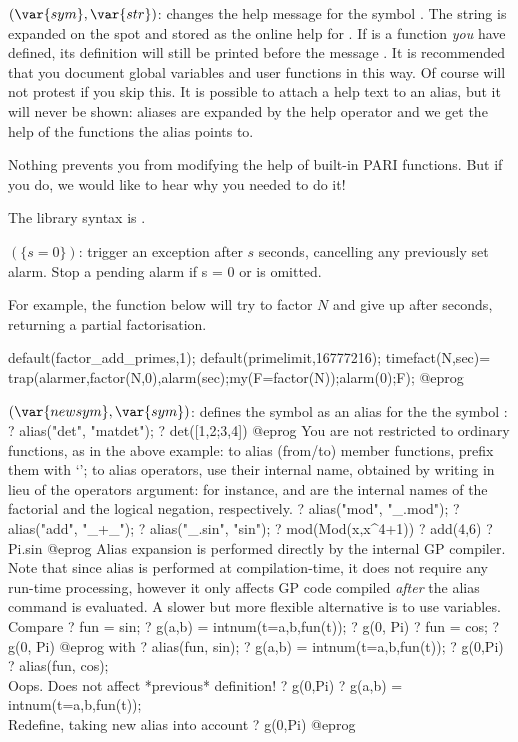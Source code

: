$(\var{sym},\var{str})$: \label{se:addhelp}changes the help message for the symbol . The string  is
expanded on the spot and stored as the online help for . If 
is a function \emph{you} have defined, its definition will still be printed
before the message .  It is recommended that you document global
variables and user functions in this way. Of course  will not protest
if you skip this.  It is possible to attach a help text to an alias, but it
will never be shown: aliases are expanded by the  help operator and we
get the help of the functions the alias points to.

Nothing prevents you from modifying the help of built-in PARI
functions. But if you do, we would like to hear why you needed to do it!

The library syntax is .

$(\{s = 0\})$: \label{se:alarm}trigger an  exception after $s$ seconds, cancelling any
previously set alarm. Stop a pending alarm if s = 0 or is omitted.

For example, the function  below
will try to factor $N$ and give up after  seconds,
returning a partial factorisation.

\bprog
default(factor_add_primes,1);
default(primelimit,16777216);
timefact(N,sec)=
{
  trap(alarmer,factor(N,0),alarm(sec);my(F=factor(N));alarm(0);F);
}
@eprog

$(\var{newsym},\var{sym})$: \label{se:alias}defines the symbol  as an alias for the the symbol :
\bprog
? alias("det", "matdet");
? det([1,2;3,4])
@eprog\noindent
You are not restricted to ordinary functions, as in the above example:
to alias (from/to) member functions, prefix them with `';
to alias operators, use their internal name, obtained by writing
\kbd{\_} in lieu of the operators argument: for instance, \kbd{\_!} and
\kbd{!\_} are the internal names of the factorial and the
logical negation, respectively.
\bprog
? alias("mod", "_.mod");
? alias("add", "_+_");
? alias("_.sin", "sin");
? mod(Mod(x,x^4+1))
? add(4,6)
? Pi.sin
@eprog
Alias expansion is performed directly by the internal GP compiler.
Note that since alias is performed at compilation-time, it does not
require any run-time processing, however it only affects GP code
compiled \emph{after} the alias command is evaluated. A slower but more
flexible alternative is to use variables. Compare
\bprog
? fun = sin;
? g(a,b) = intnum(t=a,b,fun(t));
? g(0, Pi)
? fun = cos;
? g(0, Pi)
@eprog\noindent
with
\bprog
? alias(fun, sin);
? g(a,b) = intnum(t=a,b,fun(t));
? g(0,Pi)
? alias(fun, cos);  \\ Oops. Does not affect *previous* definition!
? g(0,Pi)
? g(a,b) = intnum(t=a,b,fun(t)); \\ Redefine, taking new alias into account
? g(0,Pi)
@eprog

